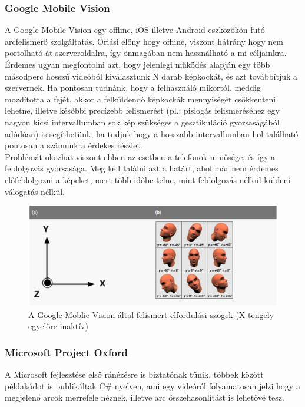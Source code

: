 \subsubsection{Google Mobile Vision}
A Google Mobile Vision\cite{GMV} egy offline, iOS illetve Android eszközökön futó arcfelismerő szolgáltatás. Óriási előny hogy offline, viszont hátrány hogy nem portolható át szerveroldalra, így önmagában nem használható a mi céljainkra. Érdemes ugyan megfontolni azt, hogy jelenlegi működés alapján egy több másodperc hosszú videóból kiválasztunk N darab képkockát, és azt továbbítjuk a szervernek. Ha pontosan tudnánk, hogy a felhasználó mikortól, meddig mozdította a fejét, akkor a felküldendő képkockák mennyiségét csökkenteni lehetne, illetve későbbi precízebb felismerést (pl.: pislogás felismeréséhez egy nagyon kicsi intervallumban sok kép szükséges a gesztikuláció gyorsaságából adódóan) is segíthetünk, ha tudjuk hogy a hosszabb intervallumban hol található pontosan a számunkra érdekes részlet.
\\Problémát okozhat viszont ebben az esetben a telefonok minősége, és így a feldolgozás gyorsasága. Meg kell találni azt a határt, ahol már nem érdemes előfeldolgozni a képeket, mert több időbe telne, mint feldolgozás nélkül küldeni válogatás nélkül.
\begin{figure}[h]
\centering
  \includegraphics[scale=0.5]{img/gmv}
    \caption{A Google Moblie Vision által felismert elfordulási szögek (X tengely egyelőre inaktív)  \cite{GMV_ANGLES}}
\end{figure}

\subsubsection{Microsoft Project Oxford}
A Microsoft fejlesztése első ránézésre is biztatónak tűnik, többek között példakódot is publikáltak C\# nyelven, ami egy videóról folyamatosan jelzi hogy a megjelenő arcok merrefele néznek, illetve arc összehasonlítást is lehetővé tesz.

